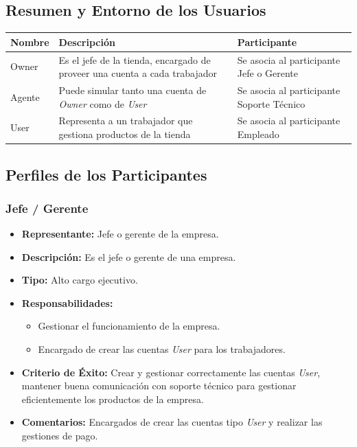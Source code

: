 \documentclass[12pt.a4paper]{article}
\begin{document}
\subsection{Resumen y Entorno de los Usuarios}

\begin{tabularx}{\textwidth}{|l|X|l|}
    \hline
    \textbf{Nombre} & \textbf{Descripción} & \textbf{Participante} \\
    \hline
    Owner & Es el jefe de la tienda, encargado de proveer una cuenta a cada trabajador & Se asocia al participante Jefe o Gerente \\
    \hline
    Agente & Puede simular tanto una cuenta de \textit{Owner} como de \textit{User} & Se asocia al participante Soporte Técnico \\
    \hline
    User & Representa a un trabajador que gestiona productos de la tienda & Se asocia al participante Empleado \\
    \hline
\end{tabularx}

\subsection{Perfiles de los Participantes}

\subsubsection{Jefe / Gerente}

\begin{itemize}
    \item \textbf{Representante:} Jefe o gerente de la empresa.
    \item \textbf{Descripción:} Es el jefe o gerente de una empresa.
    \item \textbf{Tipo:} Alto cargo ejecutivo.
    \item \textbf{Responsabilidades:}
    \begin{itemize}
        \item Gestionar el funcionamiento de la empresa.
        \item Encargado de crear las cuentas \textit{User} para los trabajadores.
    \end{itemize}
    \item \textbf{Criterio de Éxito:} Crear y gestionar correctamente las cuentas \textit{User}, mantener buena comunicación con soporte técnico para gestionar eficientemente los productos de la empresa.
    \item \textbf{Comentarios:} Encargados de crear las cuentas tipo \textit{User} y realizar las gestiones de pago.
\end{itemize}
\end{document}
